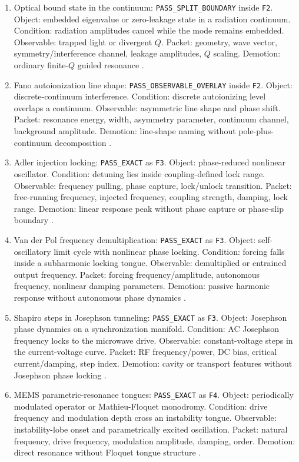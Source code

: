 \documentclass[aps,pra,reprint,nofootinbib]{revtex4-2}
\begin{document}
\begin{enumerate}
\item Optical bound state in the continuum: \texttt{PASS\_SPLIT\_BOUNDARY} inside \texttt{F2}. Object: embedded eigenvalue or zero-leakage state in a radiation continuum. Condition: radiation amplitudes cancel while the mode remains embedded. Observable: trapped light or divergent \(Q\). Packet: geometry, wave vector, symmetry/interference channel, leakage amplitudes, \(Q\) scaling. Demotion: ordinary finite-\(Q\) guided resonance \cite{hsu2013observation}.
\item Fano autoionization line shape: \texttt{PASS\_OBSERVABLE\_OVERLAY} inside \texttt{F2}. Object: discrete-continuum interference. Condition: discrete autoionizing level overlaps a continuum. Observable: asymmetric line shape and phase shift. Packet: resonance energy, width, asymmetry parameter, continuum channel, background amplitude. Demotion: line-shape naming without pole-plus-continuum decomposition \cite{fano1961effects}.
\item Adler injection locking: \texttt{PASS\_EXACT} as \texttt{F3}. Object: phase-reduced nonlinear oscillator. Condition: detuning lies inside coupling-defined lock range. Observable: frequency pulling, phase capture, lock/unlock transition. Packet: free-running frequency, injected frequency, coupling strength, damping, lock range. Demotion: linear response peak without phase capture or phase-slip boundary \cite{adler1946locking}.
\item Van der Pol frequency demultiplication: \texttt{PASS\_EXACT} as \texttt{F3}. Object: self-oscillatory limit cycle with nonlinear phase locking. Condition: forcing falls inside a subharmonic locking tongue. Observable: demultiplied or entrained output frequency. Packet: forcing frequency/amplitude, autonomous frequency, nonlinear damping parameters. Demotion: passive harmonic response without autonomous phase dynamics \cite{vanderpol1927frequency}.
\item Shapiro steps in Josephson tunneling: \texttt{PASS\_EXACT} as \texttt{F3}. Object: Josephson phase dynamics on a synchronization manifold. Condition: AC Josephson frequency locks to the microwave drive. Observable: constant-voltage steps in the current-voltage curve. Packet: RF frequency/power, DC bias, critical current/damping, step index. Demotion: cavity or transport features without Josephson phase locking \cite{shapiro1963josephson}.
\item MEMS parametric-resonance tongues: \texttt{PASS\_EXACT} as \texttt{F4}. Object: periodically modulated operator or Mathieu-Floquet monodromy. Condition: drive frequency and modulation depth cross an instability tongue. Observable: instability-lobe onset and parametrically excited oscillation. Packet: natural frequency, drive frequency, modulation amplitude, damping, order. Demotion: direct resonance without Floquet tongue structure \cite{turner1998five}.

\end{enumerate}
\end{document}
